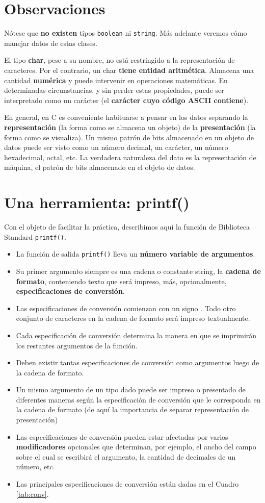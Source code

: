 \section{Observaciones}
Nótese que \textbf{no existen} tipos \texttt{boolean} ni \texttt{string}. Más adelante veremos cómo manejar datos de
estas clases.

El tipo \textbf{char}, pese a su nombre, no está restringido a la representación de caracteres. Por el contrario,
un char \textbf{tiene entidad aritmética}. Almacena una cantidad \textbf{numérica} y puede intervenir en
operaciones matemáticas. En determinadas circunstancias, y sin perder estas propiedades, puede
ser interpretado como un carácter (el \textbf{carácter cuyo código ASCII contiene}).

En general, en C es conveniente habituarse a pensar en los datos separando la \textbf{representación} (la
forma como se almacena un objeto) de la \textbf{presentación} (la forma como se visualiza). Un mismo
patrón de bits almacenado en un objeto de datos puede ser visto como un número decimal, un
carácter, un número hexadecimal, octal, etc. La verdadera naturaleza del dato es la representación
de máquina, el patrón de bits almacenado en el objeto de datos.


\section{Una herramienta: printf()}
Con el objeto de facilitar la práctica, describimos aquí la función de Biblioteca Standard \texttt{printf()}.

\begin{itemize}
	\item La función de salida \texttt{printf()} lleva un \textbf{número variable de argumentos}.
	\item Su primer argumento siempre es una cadena o constante string, la \textbf{cadena de formato},
conteniendo texto que será impreso, más, opcionalmente, \textbf{especificaciones de conversión}.
	\item Las especificaciones de conversión comienzan con un signo \quotes{\lstinline$\%$}. Todo otro conjunto de
caracteres en la cadena de formato será impreso textualmente.
	\item Cada especificación de conversión determina la manera en que se imprimirán los restantes
argumentos de la función.
	\item Deben existir tantas especificaciones de conversión como argumentos luego de la cadena de
formato.
	\item Un mismo argumento de un tipo dado puede ser impreso o presentado de diferentes maneras
según la especificación de conversión que le corresponda en la cadena de formato (de aquí la
importancia de separar representación de presentación)
	\item Las especificaciones de conversión pueden estar afectadas por varios \textbf{modificadores} opcionales
que determinan, por ejemplo, el ancho del campo sobre el cual se escribirá el argumento, la
cantidad de decimales de un número, etc.
	\item Las principales especificaciones de conversión están dadas en el Cuadro \ref{tab:conv}.
\end{itemize}

